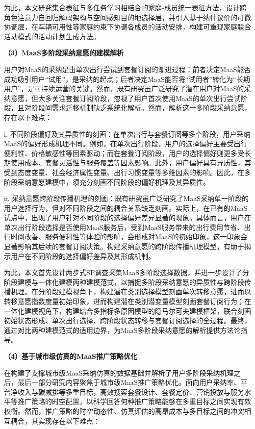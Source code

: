 为此，本文研究集合表征与多任务学习相结合的家庭-成员统一表征方法，设计跨角色注意力自回归解码架构与空间感知目的地选择层，并引入基于纳什议价的可微协调层，在车辆可用性等家庭约束下协调各成员的活动安排，构建可重现家庭联合活动模式的活动计划生成方法。

\textbf{（3）MaaS多阶段采纳意愿的建模解析}

用户对MaaS的采纳是由单次出行尝试到套餐订阅的渐进过程：前者决定MaaS能否成功吸引用户``试用''，是采纳的起点；后者决定MaaS能否将``试用者''转化为``长期用户''，是可持续运营的关键。然而，既有研究虽广泛研究了潜在用户对MaaS的采纳意愿，但大多关注套餐订阅阶段，忽视了用户首次使用MaaS的单次出行尝试阶段，且对阶段间需求迁移机制缺乏系统化解析。然而，解析这一多阶段采纳意愿，存在以下难点：

i. 不同阶段偏好及其异质性的刻画：在单次出行与套餐订阅等多个阶段，用户采纳MaaS的偏好形成机理不同。例如，在单次出行阶段，用户的选择偏好主要受出行便利性、价格敏感性等因素驱动；而在套餐订阅阶段，用户的选择偏好则更多受长期使用成本、套餐灵活性与服务覆盖等因素影响。此外，用户偏好具有异质性，其受到态度变量、社会经济属性变量、出行习惯变量等多维因素的影响。因此，在多阶段采纳意愿建模中，须充分刻画不同阶段的偏好机理及其异质性。

ii. 采纳意愿跨阶段传播机理的刻画：既有研究虽广泛研究了MaaS采纳单一阶段的用户选择行为，但对不同阶段之间的耦合关系缺乏刻画。实际上，在已有的MaaS试点中，出现了用户针对不同阶段的选择偏好差异显著的现象。具体而言，用户在单次出行阶段选择是否使用MaaS服务后，受到MaaS服务带来的出行费用节省、出行时间改善、服务便利性等体验的影响，会形成对MaaS的初始印象，这一印象会显著影响其后续的套餐订阅决策。构建采纳意愿的跨阶段传播机理模型，有助于揭示用户在不同阶段的选择偏好差异及其形成机制。

为此，本文首先设计两步式SP调查采集MaaS多阶段选择数据，并进一步设计了分阶段建模与一体化建模两种建模范式，以捕捉多阶段采纳意愿的异质性与跨阶段传播机理。在分阶段建模视角下，构建潜在类别选择模型刻画单次转移意愿，进而以转移意愿指数度量初始印象，进而构建潜在类别潜变量模型刻画套餐订阅行为；在一体化建模视角下，构建结合多指标多原因模型的隐马尔可夫建模框架，联合刻画初始状态形成、单次出行选择、跨阶段状态转移与套餐订阅选择的全过程。最终，通过对比两种建模范式的适用边界，为MaaS多阶段采纳意愿的解析提供方法论指导。

\textbf{（4）基于城市级仿真的MaaS推广策略优化}

在构建了支撑城市级MaaS采纳仿真的数据基础并解析了用户多阶段采纳机理之后，最后一部分研究内容聚焦于城市级MaaS推广策略优化。面向用户采纳率、平台净收入与碳减排等多重目标，高效搜索套餐设计、套餐定价、营销投放与服务水平等推广策略的时空配置，以科学回答何种推广策略能够在多重目标之间实现有效权衡。然而，推广策略的时空动态性、仿真评估的高昂成本与多目标之间的冲突相互耦合，其实现存在以下难点：

